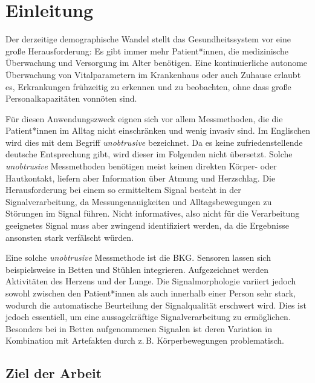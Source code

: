 \chapter{Einleitung}\label{einleitung}


Der derzeitige demographische Wandel stellt das Gesundheitssystem vor eine große Herausforderung: Es gibt immer mehr Patient*innen, die medizinische Überwachung und Versorgung im Alter benötigen. Eine kontinuierliche autonome Überwachung von Vitalparametern im Krankenhaus oder auch Zuhause erlaubt es, Erkrankungen frühzeitig zu erkennen und zu beobachten, ohne dass große Personalkapazitäten vonnöten sind.

Für diesen Anwendungszweck eignen sich vor allem Messmethoden, die die Patient*innen %
im Alltag nicht einschränken und wenig invasiv sind. Im Englischen wird dies mit dem Begriff \textit{unobtrusive} bezeichnet. Da es keine zufriedenstellende deutsche Entsprechung gibt, wird dieser im Folgenden nicht übersetzt. Solche \textit{unobtrusive} Messmethoden benötigen meist keinen direkten Körper- oder Hautkontakt, liefern aber Information über Atmung und Herzschlag. Die Herausforderung bei einem so ermitteltem Signal besteht in der Signalverarbeitung, da Messungenauigkeiten und Alltagsbewegungen zu Störungen im Signal führen. Nicht informatives, also nicht für die Verarbeitung geeignetes Signal muss aber zwingend identifiziert werden, da die Ergebnisse ansonsten stark verfälscht würden.

Eine solche \textit{unobtrusive} Messmethode ist die \acf{BKG}. Sensoren lassen sich beispielsweise in Betten und Stühlen integrieren. Aufgezeichnet werden Aktivitäten des Herzens und der Lunge. Die Signalmorphologie variiert jedoch sowohl zwischen den Patient*innen als auch innerhalb %
einer Person sehr stark, wodurch die automatische Beurteilung der Signalqualität erschwert wird. Dies ist jedoch essentiell, um eine aussagekräftige Signalverarbeitung zu ermöglichen. Besonders bei in Betten aufgenommenen Signalen ist deren Variation in Kombination mit Artefakten durch z.\,B. Körperbewegungen problematisch.  
 

\section{Ziel der Arbeit}

